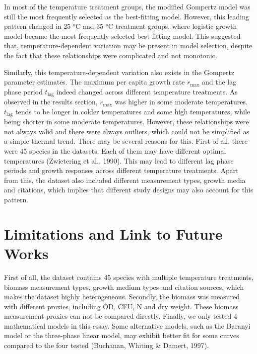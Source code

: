 \documentclass[11pt]{article}
\begin{document}
In most of the temperature treatment groups, the modified Gompertz model was still the most frequently selected as the best-fitting model. However, this leading pattern changed in 25 °C and 35 °C treatment groups, where logistic growth model became the most frequently selected best-fitting model. This suggested that, temperature-dependent variation may be present in model selection, despite the fact that these relationships were complicated and not monotonic. 

Similarly, this temperature-dependent variation also exists in the Gompertz parameter estimates. The maximum per capita growth rate \(r_{\max}\) and the lag phase period \(t_{\mathrm{lag}}\) indeed changed across different temperature treatments. As observed in the results section, \(r_{\max}\) was higher in some moderate temperatures. \(t_{\mathrm{lag}}\) tends to be longer in colder temperatures and some  high temperatures, while being shorter in some moderate temperatures. However, these relationships were not always valid and there were always outliers, which could not be simplified as a simple thermal trend. There may be several reasons for this. First of all, there were 45 species in the datasets. Each of them may have different optimal temperatures (Zwietering et al., 1990). This may lead to different lag phase periods and growth responses across different temperature treatments. Apart from this, the dataset also included different measurement types, growth media and citations, which implies that different study designs may also account for this pattern.

\section{Limitations and Link to Future Works}
First of all, the dataset contains 45 species with multiple temperature treatments, biomass measurement types, growth medium types and citation sources, which makes the dataset highly heterogeneous. Secondly, the biomass was measured with different proxies, including OD, CFU, N and dry weight. These biomass measurement proxies can not be compared directly. Finally, we only tested 4 mathematical models in this essay. Some alternative models, such as the Baranyi model or the three-phase linear model, may exhibit better fit for some curves compared to the four tested (Buchanan, Whiting \& Damert, 1997).
\end{document}
